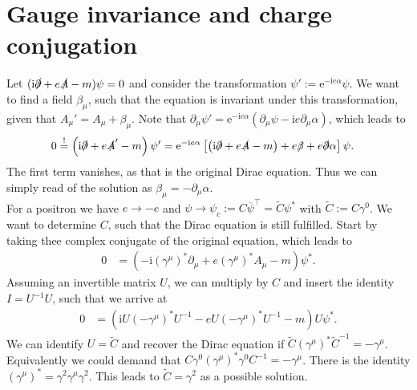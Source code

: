 \documentclass[english, parskip=full]{scrartcl}
\newcommand{\kla}{}
\newcommand{\klam}{}
\def\I{\text{i}}
\def\E{\text{e}}
\begin{document}
\section{Gauge invariance and charge conjugation}
Let $(\I\slashed{\partial}+e\slashed{A}-m)\psi=0$ and consider the transformation $\psi':=\E^{-\I e\alpha}\psi$. We want to find a field $\beta_\mu$, such that the equation is invariant under this transformation, given that $A_\mu'=A_\mu +\beta_\mu$. Note that $\partial_\mu\psi'=\E^{-\I e\alpha}(\partial_\mu\psi-\I e\partial_\mu\alpha)$, which leads to
\begin{align*}
0&\overset{!}{=}\kla\left( {\I\slashed{\partial}+e\slashed{A}'-m} \right)\psi'=\E^{-\I e\alpha}\klam\left[ {\kla\left( {\I\slashed{\partial}+e\slashed{A}-m} \right)+e\slashed{\beta}+e\slashed{\partial}\alpha} \right]\psi.
\end{align*}
The first term vanishes, as that is the original Dirac equation. Thus we can simply read of the solution as $\beta_\mu=-\partial_\mu\alpha$.\\
For a positron we have $e\rightarrow -e$ and $\psi\rightarrow\psi_c:=C\overline{\psi}^\top=\tilde{C}\psi^\ast$ with $\tilde{C}:=C\gamma^0$. We want to determine $C$, such that the Dirac equation is still fulfilled. Start by taking thee complex conjugate of the original equation, which leads to
\begin{align*}
0&=\kla\left( {-\I (\gamma^\mu)^\ast\partial_\mu + e(\gamma^\mu)^\ast A_\mu -m} \right)\psi^\ast.
\end{align*}
Assuming an invertible matrix $U$, we can multiply by $C$ and insert the identity $I=U^{-1}U$, such that we arrive at
\begin{align*}
0&=\kla\left( {\I U(-\gamma^\mu)^\ast U^{-1} - eU(-\gamma^\mu)^\ast U^{-1}-m} \right)U\psi^\ast.
\end{align*}
We can identify $U=\tilde{C}$ and recover the Dirac equation if $\tilde{C}(\gamma^\mu)^\ast \tilde{C}^{-1}=-\gamma^\mu$. Equivalently we could demand that $C\gamma^0(\gamma^\mu)^\ast\gamma^0C^{-1}=-\gamma^\mu$. There is the identity $(\gamma^\mu)^\ast=\gamma^2\gamma^\mu\gamma^2$. This leads to $\tilde{C}=\gamma^2$ as a possible solution.

\end{document}

